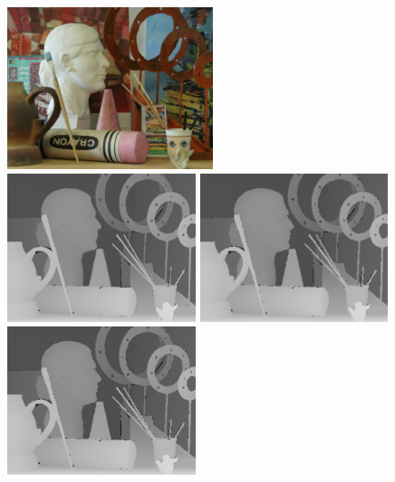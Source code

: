 \begin{figure}[t]
\begin{minipage}[b]{1.0\linewidth}
  \centering
  \centerline{\includegraphics[width=6cm]{depth_interp/quan_hf/Art.png}}
\end{minipage}
%
\vfill
\begin{minipage}[b]{0.48\linewidth}
  \centering
  \centerline{\includegraphics[width=5.5cm]{depth_interp/quan_nhf/gt.png}}
\end{minipage}
\hfill
\begin{minipage}[b]{0.48\linewidth}
  \centering
  \centerline{\includegraphics[width=5.5cm]{depth_interp/quan_nhf/bl.png}}
\end{minipage}
%
\vfill
\begin{minipage}[b]{0.48\linewidth}
  \centering
  \centerline{\includegraphics[width=5.5cm]{depth_interp/quan_nhf/bc.png}}

\end{minipage}
\end{figure}

